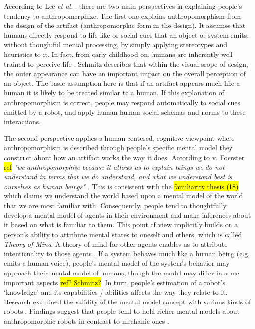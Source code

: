 \documentclass[lettersize, apacite, twoside, HRI]{apa_HRI}
\begin{document}
	According to Lee \textit{et al.} \cite{lee_human_2005}, there are two main perspectives in explaining people's tendency to anthropomorphize. The first one explains anthropomorphism from the design of the artifact (anthropomorphic form in the design). It assumes that humans directly respond to life-like or social cues that an object or system emits, without thoughtful mental processing, by simply applying stereotypes and heuristics to it. In fact, from early childhood on, humans are inherently well-trained to perceive life \cite{epley_seeing_2007}. Schmitz \cite{schmitz_concepts_2011} describes that within the visual scope of design, the outer appearance can have an important impact on the overall perception of an object. The basic assumption here is that if an artifact appears much like a human it is likely to be treated similar to a human. If this explanation of anthropomorphism is correct, people may respond automatically to social cues emitted by a robot, and apply human-human social schemas and norms to these interactions.
	
	The second perspective applies a human-centered, cognitive viewpoint where anthropomorphism is described through people's specific mental model they construct about how an artifact works the way it does. According to v. Foerster \hl{ref} \textit{"we anthropomorphize because it allows us to explain things we do not understand in terms that we do understand, and what we understand best is ourselves as human beings"} \cite{hegel_understanding_2008}. This is consistent with the \hl{familiarity thesis (18)} \cite{hegel_understanding_2008} which claims we understand the world based upon a mental model of the world that we are most familiar with. Consequently, people tend to thoughtfully develop a mental model of agents in their environment and make inferences about it based on what is familiar to them. This point of view implicitly builds on a person's ability to attribute mental states to oneself and others, which is called \textit{Theory of Mind}. A theory of  mind for other agents enables us to attribute intentionality to those agents \cite{leslie_pretense_1987,admoni_multi-category_2012}. If a system behaves much like a human being (e.g. emits a human voice), people's mental model of the system's behavior may approach their mental model of humans, though the model may differ in some important aspects \hl{ref? Schmitz?}. In turn, people's estimation of a robot's `knowledge' and its capabilities / abilities affects the way they relate to it. Research examined the validity of the mental model concept with various kinds of robots \cite{schmitz_concepts_2011,kiesler_mental_2002}. Findings suggest that people tend to hold richer mental models about anthropomorphic robots in contrast to mechanic ones \cite{kiesler_mental_2002}.
  
\end{document}

